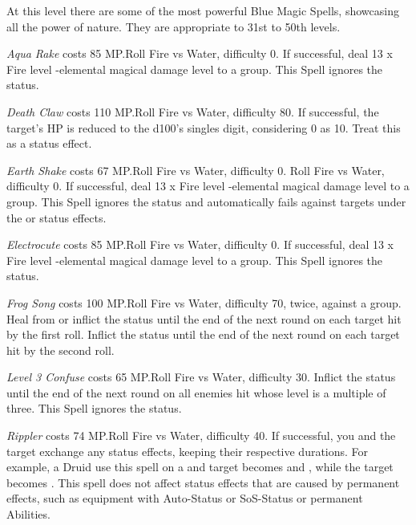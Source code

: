 \begin{multicols}{2}
	At this level there are some of the most powerful Blue Magic Spells, showcasing all the power of nature. They are appropriate to 31st to 50th levels.

    \textit{Aqua Rake} costs 85 MP.\@{}Roll Fire vs Water, difficulty 0. If successful, deal 13 x Fire level -elemental magical damage level to a group. This Spell ignores the  status.

    \textit{Death Claw} costs 110 MP.\@{}Roll Fire vs Water, difficulty 80. If successful, the target's HP is reduced to the d100’s singles digit, considering 0 as 10. Treat this as a  status effect.
    
    \textit{Earth Shake} costs 67 MP.\@{}Roll Fire vs Water, difficulty 0. Roll Fire vs Water, difficulty 0. If successful, deal 13 x Fire level -elemental magical damage level to a group. This Spell ignores the  status and automatically fails against targets under the  or  status effects.
    
    \textit{Electrocute} costs 85 MP.\@{}Roll Fire vs Water, difficulty 0. If successful, deal 13 x Fire level -elemental magical damage level to a group. This Spell ignores the  status.
    
    \textit{Frog Song} costs 100 MP.\@{}Roll Fire vs Water, difficulty 70, twice, against a group. Heal from or inflict the  status until the end of the next round on each target hit by the first roll. Inflict the  status until the end of the next round on each target hit by the second roll.
    
    \textit{Level 3 Confuse} costs 65 MP.\@{}Roll Fire vs Water, difficulty 30. Inflict the  status until the end of the next round on all enemies hit whose level is a multiple of three. This Spell ignores the  status.
    
    \textit{Rippler} costs 74 MP.\@{}Roll Fire vs Water, difficulty 40. If successful, you and the target exchange any status effects, keeping their respective durations. For example, a  Druid use this spell on a  and  target becomes  and , while the target becomes . This spell does not affect status effects that are caused by permanent effects, such as equipment with Auto-Status or SoS-Status or permanent Abilities.
    

\end{multicols}
